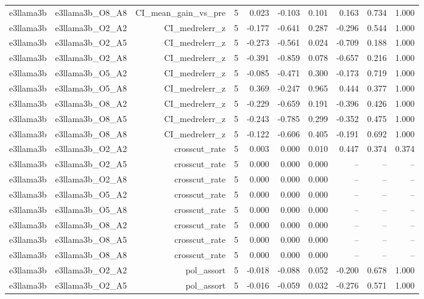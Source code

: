 \documentclass[11pt]{article}
\begin{document}
\begin{landscape}
\begin{longtable}{@{}lrrrrrrrrr@{}}
e3llama3b & e3llama3b\_O8\_A8 & CI\_mean\_gain\_vs\_pre & 5 & 0.023 & -0.103 & 0.101 & 0.163 & 0.734 & 1.000 \\
e3llama3b & e3llama3b\_O2\_A2 & CI\_medrelerr\_z & 5 & -0.177 & -0.641 & 0.287 & -0.296 & 0.544 & 1.000 \\
e3llama3b & e3llama3b\_O2\_A5 & CI\_medrelerr\_z & 5 & -0.273 & -0.561 & 0.024 & -0.709 & 0.188 & 1.000 \\
e3llama3b & e3llama3b\_O2\_A8 & CI\_medrelerr\_z & 5 & -0.391 & -0.859 & 0.078 & -0.657 & 0.216 & 1.000 \\
e3llama3b & e3llama3b\_O5\_A2 & CI\_medrelerr\_z & 5 & -0.085 & -0.471 & 0.300 & -0.173 & 0.719 & 1.000 \\
e3llama3b & e3llama3b\_O5\_A8 & CI\_medrelerr\_z & 5 & 0.369 & -0.247 & 0.965 & 0.444 & 0.377 & 1.000 \\
e3llama3b & e3llama3b\_O8\_A2 & CI\_medrelerr\_z & 5 & -0.229 & -0.659 & 0.191 & -0.396 & 0.426 & 1.000 \\
e3llama3b & e3llama3b\_O8\_A5 & CI\_medrelerr\_z & 5 & -0.243 & -0.785 & 0.299 & -0.352 & 0.475 & 1.000 \\
e3llama3b & e3llama3b\_O8\_A8 & CI\_medrelerr\_z & 5 & -0.122 & -0.606 & 0.405 & -0.191 & 0.692 & 1.000 \\
e3llama3b & e3llama3b\_O2\_A2 & crosscut\_rate & 5 & 0.003 & 0.000 & 0.010 & 0.447 & 0.374 & 0.374 \\
e3llama3b & e3llama3b\_O2\_A5 & crosscut\_rate & 5 & 0.000 & 0.000 & 0.000 & -- & -- & -- \\
e3llama3b & e3llama3b\_O2\_A8 & crosscut\_rate & 5 & 0.000 & 0.000 & 0.000 & -- & -- & -- \\
e3llama3b & e3llama3b\_O5\_A2 & crosscut\_rate & 5 & 0.000 & 0.000 & 0.000 & -- & -- & -- \\
e3llama3b & e3llama3b\_O5\_A8 & crosscut\_rate & 5 & 0.000 & 0.000 & 0.000 & -- & -- & -- \\
e3llama3b & e3llama3b\_O8\_A2 & crosscut\_rate & 5 & 0.000 & 0.000 & 0.000 & -- & -- & -- \\
e3llama3b & e3llama3b\_O8\_A5 & crosscut\_rate & 5 & 0.000 & 0.000 & 0.000 & -- & -- & -- \\
e3llama3b & e3llama3b\_O8\_A8 & crosscut\_rate & 5 & 0.000 & 0.000 & 0.000 & -- & -- & -- \\
e3llama3b & e3llama3b\_O2\_A2 & pol\_assort & 5 & -0.018 & -0.088 & 0.052 & -0.200 & 0.678 & 1.000 \\
e3llama3b & e3llama3b\_O2\_A5 & pol\_assort & 5 & -0.016 & -0.059 & 0.032 & -0.276 & 0.571 & 1.000 \\

\end{longtable}
\end{landscape}
\end{document}
